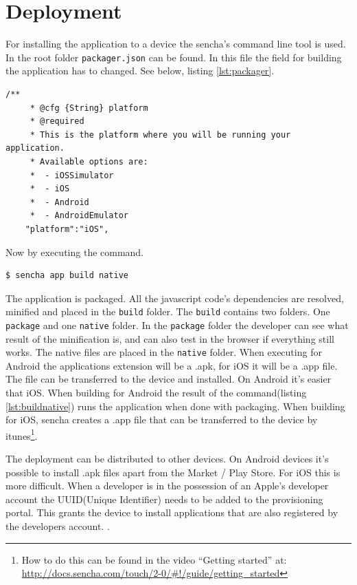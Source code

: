 \section{Deployment}
For installing the application to a device the sencha's command line tool is used. In the root folder \texttt{packager.json} can be found. In this file the field for building the application has to changed. See below, listing \ref{lst:packager}.
\begin{lstlisting}[caption={packager.json},label={lst:packager}]
	/**
	 * @cfg {String} platform
	 * @required
	 * This is the platform where you will be running your application.
	 * Available options are:
	 *  - iOSSimulator
	 *  - iOS
	 *  - Android
	 *  - AndroidEmulator
	"platform":"iOS",
\end{lstlisting}
Now by executing the command.
\label{appnative}
\begin{lstlisting}[caption={command to build native},label={lst:buildnative}]
$ sencha app build native
\end{lstlisting}
The application is packaged. All the javascript code's dependencies are resolved, minified and placed in the \texttt{build} folder. The \texttt{build} contains two folders. One \texttt{package} and one \texttt{native} folder. In the \texttt{package} folder the developer can see what result of the minification is, and can also test in the browser if everything still works. The native files are placed in the \texttt{native} folder. When executing for Android the applications extension will be a .apk, for iOS it will be a .app file.  The file can be transferred to the device and installed. On Android it's easier that iOS. When building for Android the result of the command(listing \ref{lst:buildnative}) runs the application when done with packaging. When building for iOS, sencha creates a .app file that can be transferred to the device by itunes\footnote{How to do this can be found in the video ``Getting started'' at: \url{http://docs.sencha.com/touch/2-0/\#!/guide/getting\_started}}.

The deployment can be distributed to other devices. On Android devices it's possible to install .apk files apart from the Market / Play Store. For iOS this is more difficult. When a developer is in the possession of an Apple's developer account the UUID(Unique Identifier) needs to be added to the provisioning portal. This grants the device to install applications that are also registered by the developers account. .

